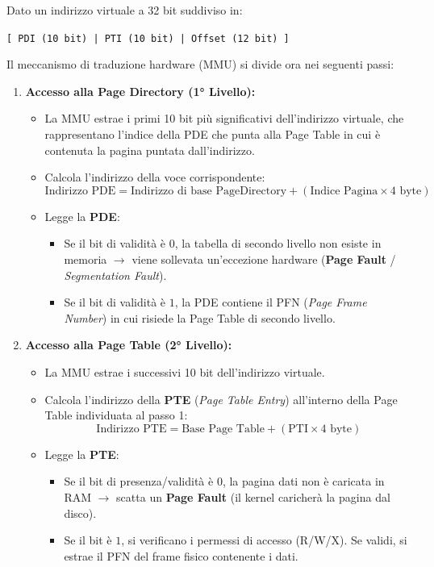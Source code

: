 \documentclass[12pt]{report}
\begin{document}
	Dato un indirizzo virtuale a 32 bit suddiviso in:
	\begin{center}
		\texttt{[ PDI (10 bit) | PTI (10 bit) | Offset (12 bit) ]}
	\end{center}
	
	Il meccanismo di traduzione hardware (MMU) si divide ora nei seguenti passi:
	\begin{enumerate}
		\item \textbf{Accesso alla Page Directory (1° Livello):}
		\begin{itemize}
			\item La MMU estrae i primi 10 bit più significativi dell'indirizzo virtuale, che rappresentano l'indice della PDE che punta alla Page Table in cui è contenuta la pagina puntata dall'indirizzo.
			
			\item Calcola l'indirizzo della voce corrispondente:
			$$\text{Indirizzo PDE} = \text{Indirizzo di base PageDirectory} + (\text{Indice Pagina} \times 4\text{ byte})$$
			\item Legge la \textbf{PDE}:
			\begin{itemize}
				\item Se il bit di validità è $0$, la tabella di secondo livello non esiste in memoria $\rightarrow$ viene sollevata un'eccezione hardware (\textbf{Page Fault} / \textit{Segmentation Fault}).
				\item Se il bit di validità è $1$, la PDE contiene il PFN (\textit{Page Frame Number}) in cui risiede la Page Table di secondo livello.
			\end{itemize}
		\end{itemize}
		
		\item \textbf{Accesso alla Page Table (2° Livello):}
		\begin{itemize}
			\item La MMU estrae i successivi 10 bit dell'indirizzo virtuale.
			
			\item Calcola l'indirizzo della \textbf{PTE} (\textit{Page Table Entry}) all'interno della Page Table individuata al passo 1:
			$$\text{Indirizzo PTE} = \text{Base Page Table} + (\text{PTI} \times 4\text{ byte})$$
			\item Legge la \textbf{PTE}:
			\begin{itemize}
				\item Se il bit di presenza/validità è $0$, la pagina dati non è caricata in RAM $\rightarrow$ scatta un \textbf{Page Fault} (il kernel caricherà la pagina dal disco).
				\item Se il bit è $1$, si verificano i permessi di accesso (R/W/X). Se validi, si estrae il PFN del frame fisico contenente i dati.
			\end{itemize}
		\end{itemize}
		

\end{enumerate}
\end{document}

